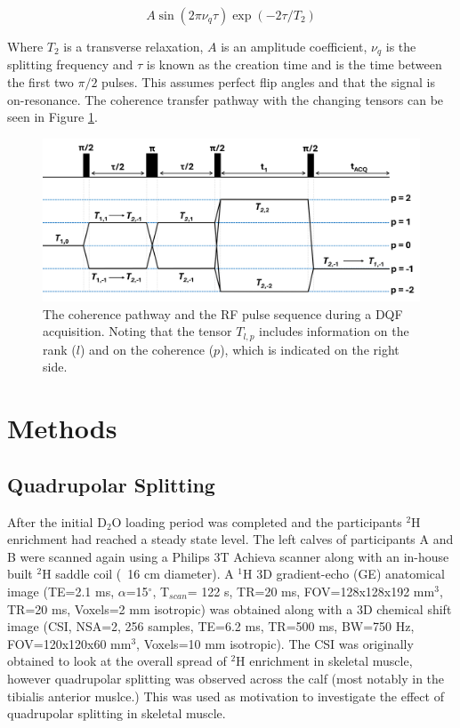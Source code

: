 \documentclass[class=article, crop=false]{standalone}
\begin{document}
\begin{equation}
    A\sin(2\pi\nu_q\tau)\exp(-2\tau/T_2)
    \label{eqn:Quad:Amplitude}
\end{equation}

Where $T_2$ is a transverse relaxation, $A$ is an amplitude coefficient, $\nu_q$ is the splitting frequency and $\tau$ is known as the creation time and is the time between the first two $\pi/2$ pulses. This assumes perfect flip angles and that the signal is on-resonance. The coherence transfer pathway with the changing tensors can be seen in Figure \ref{fig:Quad:Coherence}.

\begin{figure}
    \centering
    \includegraphics[width=1\textwidth]{Figures/Quad/DQF_Coherence.png}
    \caption{The coherence pathway and the RF pulse sequence during a DQF acquisition. Noting that the tensor $T_{l,p}$ includes information on the rank ($l$) and on the coherence ($p$), which is indicated on the right side.}
    \label{fig:Quad:Coherence}
\end{figure}

\section{Methods}

\subsection{Quadrupolar Splitting}

After the initial D$_2$O loading period was completed and the participants $^2$H enrichment had reached a steady state level. The left calves of participants A and B were scanned again using a Philips 3T Achieva scanner along with an in-house built $^2$H saddle coil (~16 cm diameter). A $^1$H 3D gradient-echo (GE) anatomical image (TE=2.1 ms, $\alpha$=15$^{\circ}$, T$_{scan}$= 122 s, TR=20 ms, FOV=128x128x192 mm$^3$, TR=20 ms, Voxels=2 mm isotropic) was obtained along with a 3D chemical shift image (CSI, NSA=2, 256 samples, TE=6.2 ms, TR=500 ms, BW=750 Hz, FOV=120x120x60 mm$^3$, Voxels=10 mm isotropic). The CSI was originally obtained to look at the overall spread of $^2$H enrichment in skeletal muscle, however quadrupolar splitting was observed across the calf (most notably in the tibialis anterior muslce.) This was used as motivation to investigate the effect of quadrupolar splitting in skeletal muscle.
\end{document}

